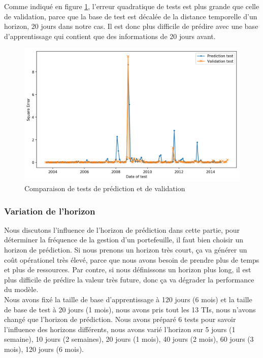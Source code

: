 Comme indiqué en figure \ref{fig:test}, l'erreur quadratique de tests est plus grande que celle de validation, parce que la base de test est décalée de la distance temporelle d'un horizon, 20 jours dans notre cas. Il est donc plus difficile de prédire avec une base d'apprentissage qui contient que des informations de 20 jours avant.


\begin{figure}[H]
\centering
\includegraphics[width=.9\linewidth, scale=0.2]
{plot/VP.png}
\caption{Comparaison de tests de prédiction et de validation}
\label{fig:test}
\end{figure}


\subsubsection{Variation de l'horizon}

Nous discutons l'influence de l'horizon de prédiction dans cette partie, pour déterminer la fréquence de la gestion d'un portefeuille, il faut bien choisir un horizon de prédiction. Si nous prenons un horizon très court, ça va générer un coût opérationel très élevé, parce que nous avons besoin de prendre plus de temps et plus de ressources. Par contre, si nous définissons un horizon plus long, il est plus difficile de prédire la valeur très future, donc ça va dégrader la performance du modèle. \\

Nous avons fixé la taille de base d'apprentissage à 120 jours (6 mois) et la taille de base de test à 20 jours (1 mois), nous avons pris tout les 13 TIs, nous n'avons changé que l'horizon de prédiction. Nous avons préparé 6 tests pour savoir l'influence des horizons différents, nous avons varié l'horizon sur 5 jours (1 semaine), 10 jours (2 semaines), 20 jours (1 mois), 40 jours (2 mois), 60 jours (3 mois), 120 jours (6 mois). \\

